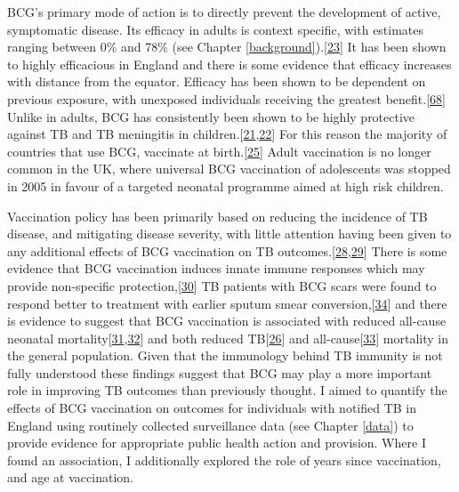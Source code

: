 \documentclass[11pt,twoside]{bristolthesis}
\begin{document}
  BCG's primary mode of action is to directly prevent the development of active, symptomatic disease. Its efficacy in adults is context specific, with estimates ranging between 0\% and 78\% (see Chapter \ref{background}).{[}\protect\hyperlink{ref-Mangtani2014a}{23}{]} It has been shown to highly efficacious in England and there is some evidence that efficacy increases with distance from the equator. Efficacy has been shown to be dependent on previous exposure, with unexposed individuals receiving the greatest benefit.{[}\protect\hyperlink{ref-Barreto2014a}{68}{]} Unlike in adults, BCG has consistently been shown to be highly protective against TB and TB meningitis in children.{[}\protect\hyperlink{ref-Rodrigues1993}{21},\protect\hyperlink{ref-Colditz1994}{22}{]} For this reason the majority of countries that use BCG, vaccinate at birth.{[}\protect\hyperlink{ref-Zwerling2011}{25}{]} Adult vaccination is no longer common in the UK, where universal BCG vaccination of adolescents was stopped in 2005 in favour of a targeted neonatal programme aimed at high risk children.
  
  Vaccination policy has been primarily based on reducing the incidence of TB disease, and mitigating disease severity, with little attention having been given to any additional effects of BCG vaccination on TB outcomes.{[}\protect\hyperlink{ref-Fine2005a}{28},\protect\hyperlink{ref-Teo2006}{29}{]} There is some evidence that BCG vaccination induces innate immune responses which may provide non-specific protection,{[}\protect\hyperlink{ref-Kleinnijenhuis2012}{30}{]} TB patients with BCG scars were found to respond better to treatment with earlier sputum smear conversion,{[}\protect\hyperlink{ref-Jeremiah2010}{34}{]} and there is evidence to suggest that BCG vaccination is associated with reduced all-cause neonatal mortality{[}\protect\hyperlink{ref-Garly2003}{31},\protect\hyperlink{ref-Higgins}{32}{]} and both reduced TB{[}\protect\hyperlink{ref-Abubakar2013}{26}{]} and all-cause{[}\protect\hyperlink{ref-Rieckmann2016}{33}{]} mortality in the general population. Given that the immunology behind TB immunity is not fully understood these findings suggest that BCG may play a more important role in improving TB outcomes than previously thought. I aimed to quantify the effects of BCG vaccination on outcomes for individuals with notified TB in England using routinely collected surveillance data (see Chapter \ref{data}) to provide evidence for appropriate public health action and provision. Where I found an association, I additionally explored the role of years since vaccination, and age at vaccination.
  
\end{document}

